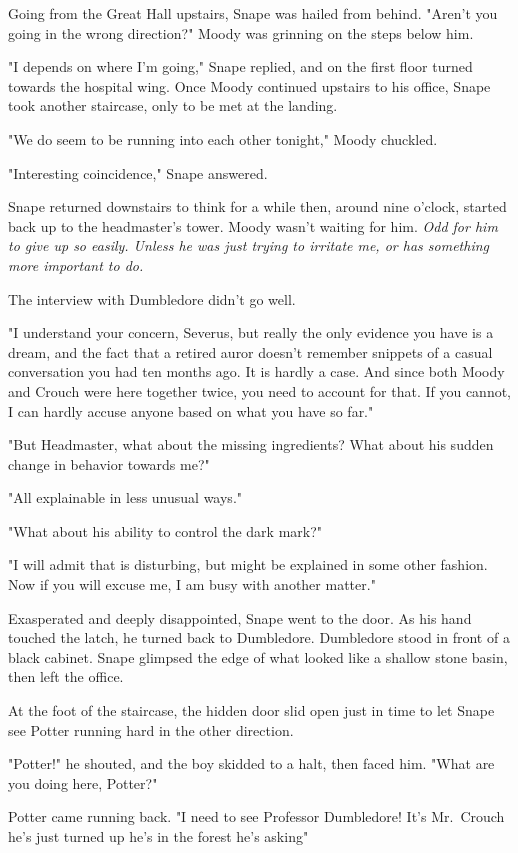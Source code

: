 Going from the Great Hall upstairs, Snape was hailed from behind. "Aren't you going in the wrong direction?" Moody was grinning on the steps below him.

"I depends on where I'm going," Snape replied, and on the first floor turned towards the hospital wing. Once Moody continued upstairs to his office, Snape took another staircase, only to be met at the landing.

"We do seem to be running into each other tonight," Moody chuckled.

"Interesting coincidence," Snape answered.

Snape returned downstairs to think for a while then, around nine o'clock, started back up to the headmaster's tower. Moody wasn't waiting for him. \emph{Odd for him to give up so easily. Unless he was just trying to irritate me, or has something more important to do.}

The interview with Dumbledore didn't go well.

"I understand your concern, Severus, but really the only evidence you have is a dream, and the fact that a retired auror doesn't remember snippets of a casual conversation you had ten months ago. It is hardly a case. And since both Moody and Crouch were here together twice, you need to account for that. If you cannot, I can hardly accuse anyone based on what you have so far."

"But Headmaster, what about the missing ingredients? What about his sudden change in behavior towards me?"

"All explainable in less{\el} unusual ways."

"What about his ability to control the dark mark?"

"I will admit that is disturbing, but might be explained in some other fashion. Now if you will excuse me, I am busy with another matter."

Exasperated and deeply disappointed, Snape went to the door. As his hand touched the latch, he turned back to Dumbledore. Dumbledore stood in front of a black cabinet. Snape glimpsed the edge of what looked like a shallow stone basin, then left the office.

At the foot of the staircase, the hidden door slid open just in time to let Snape see Potter running hard in the other direction.

"Potter!" he shouted, and the boy skidded to a halt, then faced him. "What are you doing here, Potter?"

Potter came running back. "I need to see Professor Dumbledore! It's Mr.~Crouch{\el} he's just turned up{\el} he's in the forest{\el} he's asking{\el}"


